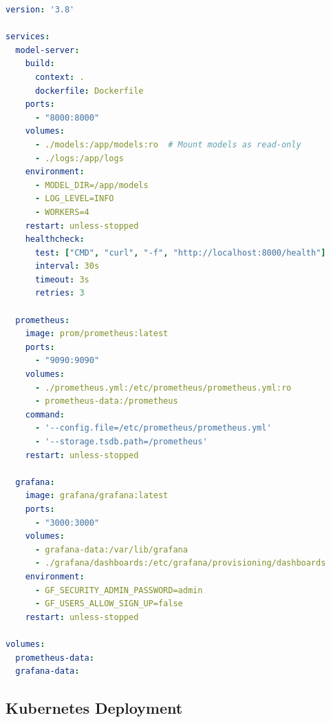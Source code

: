 \begin{lstlisting}[language=yaml, caption={Docker Compose for Local Development}]
version: '3.8'

services:
  model-server:
    build:
      context: .
      dockerfile: Dockerfile
    ports:
      - "8000:8000"
    volumes:
      - ./models:/app/models:ro  # Mount models as read-only
      - ./logs:/app/logs
    environment:
      - MODEL_DIR=/app/models
      - LOG_LEVEL=INFO
      - WORKERS=4
    restart: unless-stopped
    healthcheck:
      test: ["CMD", "curl", "-f", "http://localhost:8000/health"]
      interval: 30s
      timeout: 3s
      retries: 3

  prometheus:
    image: prom/prometheus:latest
    ports:
      - "9090:9090"
    volumes:
      - ./prometheus.yml:/etc/prometheus/prometheus.yml:ro
      - prometheus-data:/prometheus
    command:
      - '--config.file=/etc/prometheus/prometheus.yml'
      - '--storage.tsdb.path=/prometheus'
    restart: unless-stopped

  grafana:
    image: grafana/grafana:latest
    ports:
      - "3000:3000"
    volumes:
      - grafana-data:/var/lib/grafana
      - ./grafana/dashboards:/etc/grafana/provisioning/dashboards
    environment:
      - GF_SECURITY_ADMIN_PASSWORD=admin
      - GF_USERS_ALLOW_SIGN_UP=false
    restart: unless-stopped

volumes:
  prometheus-data:
  grafana-data:
\end{lstlisting}

\subsection{Kubernetes Deployment}

